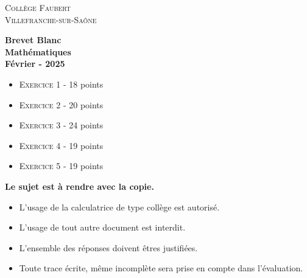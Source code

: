 






\begin{titlepage}

    \center %
    
    \textsc{\LARGE Collège Faubert}\\[2cm] %
    \textsc{\large Villefranche-sur-Saône}\\[2cm] %
    
    \horrule{2px}
    
    \vspace{0.5cm}
    
    { \Huge \bfseries Brevet Blanc}\\[2cm] %
    { \Huge \bfseries Mathématiques}\\[2cm] %
    {\large \bfseries Février - 2025}\\[2cm] 
    
    \horrule{2px}
    
    \vspace{0.5cm}
    
    \begin{itemize}[label={$\bullet$}]
      \item \textsc{Exercice 1} - 18 points     
      \item \textsc{Exercice 2} - 20 points 
      \item \textsc{Exercice 3} - 24 points
      \item \textsc{Exercice 4} - 19 points 
      \item \textsc{Exercice 5} - 19 points  
    \end{itemize}
    
    \vspace{0.5cm}
    
    \horrule{2px}
    
    \vspace{0.5cm}
    
    \textbf{Le sujet est à rendre avec la copie.}
    
    \vspace{0.5cm}
    
    \begin{itemize}
      \item L'usage de la calculatrice de type collège est autorisé.
      \item L'usage de tout autre document est interdit. 
      \item L'ensemble des réponses doivent êtres justifiées.
      \item Toute trace écrite, même incomplète sera prise en compte dans l'évaluation.
    \end{itemize}
    
    \vfill 
    
    \end{titlepage}
    
